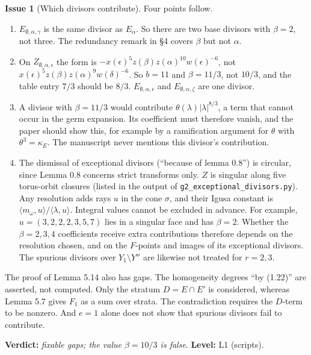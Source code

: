 \documentclass[12pt,letterpaper]{article}
\newcommand{\Lv}[1]{\textsf{L#1}}
\newcommand{\verdict}[1]{\textbf{Verdict:} \emph{#1}.}
\newcommand{\level}[1]{\textbf{Level:} #1.}
\theoremstyle{definition}
\newtheorem{issue}{Issue}[section]
\begin{document}
\begin{issue}[Which divisors contribute]
\noindent Four points follow.
\begin{enumerate}[label=(\alph*)]
\item $E_{\emptyset,\alpha,\gamma}$ is the same divisor as $E_\alpha$. So
there are two base divisors with $\beta=2$, not three. The redundancy remark
in \S4 covers $\beta$ but not $\alpha$.
\item On $Z_{\emptyset,\alpha,\epsilon}$ the form is
$-x(\epsilon)^5z(\beta)z(\alpha)^{10}w(\epsilon)^{-6}$, not
$x(\epsilon)^5z(\beta)z(\alpha)^9w(\delta)^{-6}$. So $b=11$ and
$\beta=11/3$, not $10/3$, and the table entry $7/3$ should be $8/3$.
$E_{\emptyset,\alpha,\epsilon}$ and $E_{\emptyset,\alpha,\zeta}$ are one
divisor.
\item A divisor with $\beta=11/3$ would contribute $\theta(\lambda)|\lambda|^{8/3}$,
a term that cannot occur in the germ expansion. Its coefficient must therefore
vanish, and the paper should show this, for example by a ramification argument
for $\theta$ with $\theta^3=\kappa_E$. The manuscript never mentions this
divisor's contribution.
\item The dismissal of exceptional divisors (``because of lemma 0.8'') is
circular, since Lemma 0.8 concerns strict transforms only. $Z$ is singular
along five torus-orbit closures (listed in the output of
\texttt{g2\_exceptional\_divisors.py}). Any resolution adds rays $u$ in the
cone $\sigma$, and their Igusa constant is $\langle m_\omega,u\rangle/\langle\lambda,u\rangle$.
Integral values cannot be excluded in advance. For example,
$u=(3,2,2,2,3,5,7)$ lies in a singular face and has $\beta=2$. Whether the
$\beta=2,3,4$ coefficients receive extra contributions therefore depends on
the resolution chosen, and on the $F$-points and images of its exceptional
divisors. The spurious divisors over $Y_1\setminus Y''$ are likewise not
treated for $r=2,3$.
\end{enumerate}

The proof of Lemma 5.14 also has gaps. The homogeneity degrees ``by (1.22)''
are asserted, not computed. Only the stratum $D=E\cap E'$ is considered,
whereas Lemma 5.7 gives $F_1$ as a sum over strata. The contradiction requires
the $D$-term to be nonzero. And $e=1$ alone does not show that spurious
divisors fail to contribute.

\verdict{fixable gaps; the value $\beta=10/3$ is false}
\level{\Lv{1} (scripts)}
\end{issue}
\end{document}
